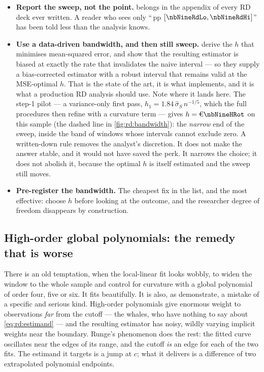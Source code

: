\begin{itemize}[leftmargin=*, itemsep=.3em]
  \item \textbf{Report the sweep, not the point.}  belongs in the appendix of
        every RD deck ever written. A reader who sees only ``\nbNineRd{}\,pp
        $[\nbNineRdLo, \nbNineRdHi]$'' has been told less than the analysis knows.
  \item \textbf{Use a data-driven bandwidth, and then still sweep.}  derive the
        $h$ that minimises mean-squared error, and \citet{calonico2014} show that the resulting
        estimator is biased at exactly the rate that invalidates the naive interval --- so they
        supply a bias-corrected estimator with a robust interval that remains valid at the
        MSE-optimal $h$. That is the state of the art, it is what  implements, and
        it is what a production RD analysis should use. Note where it lands here. The
        \citeauthor{imbens2012} step-1 pilot --- a variance-only first pass,
        $h_1 = 1.84\,\hat\sigma_S\, n^{-1/5}$, which the full procedures then refine with a
        curvature term --- gives $h = \eur{\nbNineHRot}$ on this sample (the dashed line in
        \cref{fig:rd:bandwidth}): the \emph{narrow} end of the sweep, inside the band of
        \nbNineBwNInsignif{} windows whose intervals cannot exclude zero. A written-down rule removes
        the analyst's discretion. It does not make the answer stable, and it would not have saved
        the perk. It narrows the choice; it does not abolish it, because the optimal $h$ is itself
        estimated and the sweep still moves.
  \item \textbf{Pre-register the bandwidth.} The cheapest fix in the list, and the most effective:
        choose $h$ before looking at the outcome, and the researcher degree of freedom disappears
        by construction.
\end{itemize}

\subsection*{High-order global polynomials: the remedy that is worse}

There is an old temptation, when the local-linear fit looks wobbly, to widen the window to the whole
sample and control for curvature with a global polynomial of order four, five or six. It fits
beautifully. It is also, as \citet{gelman2019} demonstrate, a mistake of a specific and serious
kind. High-order polynomials give enormous weight to observations \emph{far} from the cutoff ---
the whales, who have nothing to say about \cref{eq:rd:estimand} --- and the resulting estimator has
noisy, wildly varying implicit weights near the boundary. Runge's phenomenon does the rest: the
fitted curve oscillates near the edges of its range, and the cutoff \emph{is} an edge for each of
the two fits. The estimand it targets is a jump at $c$; what it delivers is a difference of two
extrapolated polynomial endpoints.

